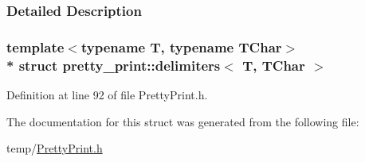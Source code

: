 \subsubsection{Detailed Description}
\subsubsection*{template$<$typename T, typename T\+Char$>$\\*
struct pretty\+\_\+print\+::delimiters$<$ T, T\+Char $>$}



Definition at line 92 of file Pretty\+Print.\+h.



The documentation for this struct was generated from the following file\+:\begin{DoxyCompactItemize}
\item 
temp/\hyperlink{PrettyPrint_8h}{Pretty\+Print.\+h}\end{DoxyCompactItemize}
